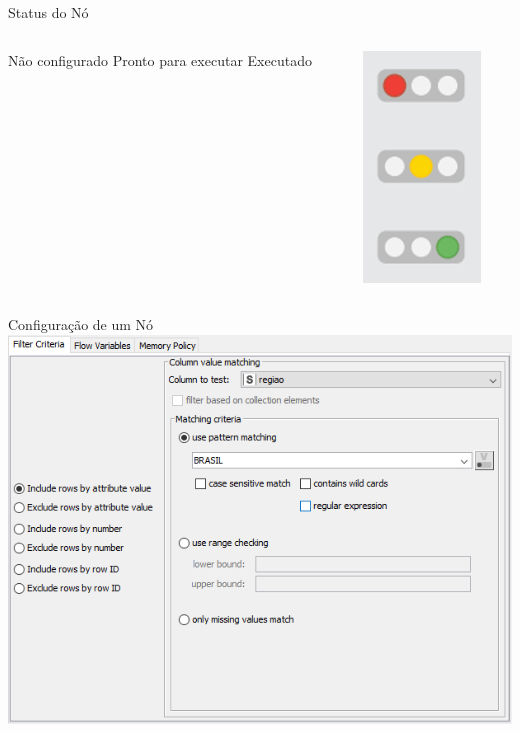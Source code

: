 \documentclass{beamer}
\begin{document}
\begin{frame}{Status do Nó}
    \begin{columns}
        \begin{column}{0.5\linewidth}
            \begin{outline}
                \1 Não configurado
                \1 Pronto para executar
                \1 Executado
            \end{outline}
        \end{column}
        \begin{column}{0.5\linewidth}
            \centering
            \includegraphics[height=0.6\textheight]{Images/statusdono.png}
        \end{column}
    \end{columns}
\end{frame} 


\begin{frame}{Configuração de um Nó}
    \centering
    \includegraphics[width=0.7\linewidth]{Images/configuracaofiltro.png}
\end{frame} 
\end{document}
